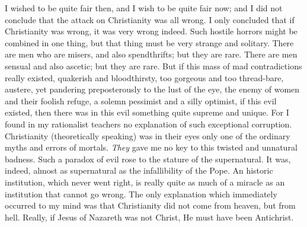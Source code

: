 \documentclass{book}
\begin{document}
I wished to be quite fair then, and I wish to be quite fair now; and I did not conclude that the attack on Christianity was all wrong. I only concluded that if Christianity was wrong, it was very wrong indeed. Such hostile horrors might be combined in one thing, but that thing must be very strange and solitary. There are men who are misers, and also spendthrifts; but they are rare. There are men sensual and also ascetic; but they are rare. But if this mass of mad contradictions really existed, quakerish and bloodthirsty, too gorgeous and too thread-bare, austere, yet pandering preposterously to the lust of the eye, the enemy of women and their foolish refuge, a solemn pessimist and a silly optimist, if this evil existed, then there was in this evil something quite supreme and unique. For I found in my rationalist teachers no explanation of such exceptional corruption. Christianity (theoretically speaking) was in their eyes only one of the ordinary myths and errors of mortals. \emph{They} gave me no key to this twisted and unnatural badness. Such a paradox of evil rose to the stature of the supernatural. It was, indeed, almost as supernatural as the infallibility of the Pope. An historic institution, which never went right, is really quite as much of a miracle as an institution that cannot go wrong. The only explanation which immediately occurred to my mind was that Christianity did not come from heaven, but from hell. Really, if Jesus of Nazareth was not Christ, He must have been Antichrist.
\end{document}
